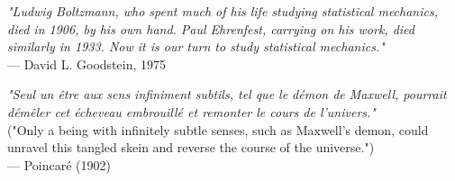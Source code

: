 \begin{flushright}
\emph{"Ludwig Boltzmann, who spent much of his life studying statistical mechanics, died in 1906, by his own hand. Paul Ehrenfest, carrying on his work, died similarly in 1933. Now it is our turn to study statistical mechanics."}\\
 — David L. Goodstein, 1975
\end{flushright}
\vspace{2em}
\begin{flushright}
\emph{"Seul un être aux sens infiniment subtils, tel que le démon de Maxwell, pourrait démêler cet écheveau embrouillé et remonter le cours de l’univers."} \\  
("Only a being with infinitely subtle senses, such as Maxwell’s demon, could unravel this tangled skein and reverse the course of the universe.") \\
 — Poincaré (1902)
\end{flushright}
